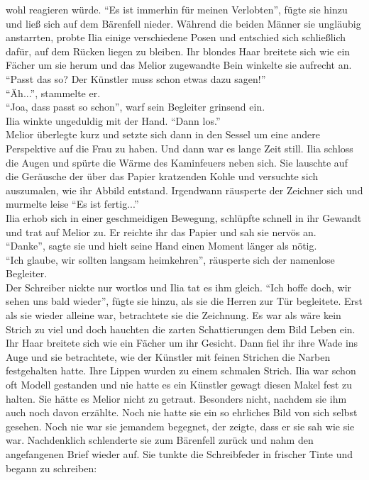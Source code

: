 wohl reagieren würde. ``Es ist immerhin für meinen Verlobten'', fügte sie hinzu und ließ sich auf 
dem Bärenfell nieder. Während die beiden Männer sie ungläubig anstarrten, probte Ilia einige 
verschiedene Posen und entschied sich schließlich dafür, auf dem Rücken liegen zu bleiben. Ihr 
blondes Haar breitete sich wie ein Fächer um sie herum und das Melior zugewandte Bein winkelte sie 
aufrecht an. ``Passt das so? Der Künstler muss schon etwas dazu sagen!''\\
``Äh...'', stammelte er.\\
``Joa, dass passt so schon'', warf sein Begleiter grinsend ein.\\
Ilia winkte ungeduldig mit der Hand. ``Dann los.''\\
Melior überlegte kurz und setzte sich dann in den Sessel um eine andere Perspektive auf die Frau zu 
haben. Und dann war es lange Zeit still. Ilia schloss die Augen und spürte die Wärme des 
Kaminfeuers neben sich. Sie lauschte auf die Geräusche der über das Papier kratzenden Kohle und 
versuchte sich auszumalen, wie ihr Abbild entstand. Irgendwann räusperte der Zeichner sich und 
murmelte leise ``Es ist fertig...''\\
Ilia erhob sich in einer geschmeidigen Bewegung, schlüpfte schnell in ihr Gewandt und trat auf 
Melior zu. Er reichte ihr das Papier und sah sie nervös an.\\
``Danke'', sagte sie und hielt seine Hand einen Moment länger als nötig.\\
``Ich glaube, wir sollten langsam heimkehren'', räusperte sich der namenlose Begleiter.\\
Der Schreiber nickte nur wortlos und Ilia tat es ihm gleich. ``Ich hoffe doch, wir sehen uns bald 
wieder'', fügte sie hinzu, als sie die Herren zur Tür begleitete. Erst als sie wieder alleine war, 
betrachtete sie die Zeichnung. Es war als wäre kein Strich zu viel und doch hauchten die zarten 
Schattierungen dem Bild Leben ein. Ihr Haar breitete sich wie ein Fächer um ihr Gesicht. Dann fiel 
ihr ihre Wade ins Auge und sie betrachtete, wie der Künstler mit feinen Strichen die Narben 
festgehalten hatte. Ihre Lippen wurden zu einem schmalen Strich. Ilia war schon oft Modell 
gestanden und nie hatte es ein Künstler gewagt diesen Makel fest zu halten. Sie hätte es Melior 
nicht zu getraut. Besonders nicht, nachdem sie ihm auch noch davon erzählte. Noch nie hatte sie ein 
so ehrliches Bild von sich selbst gesehen. Noch nie war sie jemandem begegnet, der zeigte, dass er 
sie sah wie sie war. Nachdenklich schlenderte sie zum Bärenfell zurück und nahm den angefangenen 
Brief wieder auf. Sie tunkte die Schreibfeder in frischer Tinte und begann zu schreiben:

